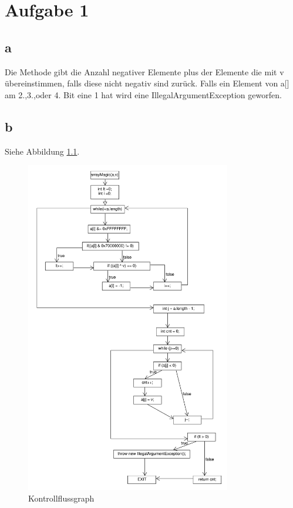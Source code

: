 \chapter{Aufgabe 1 }
\section*{a}
Die Methode gibt die Anzahl negativer Elemente plus der Elemente die mit v übereinstimmen, falls diese nicht negativ sind zurück. Falls ein Element von a[] am 2.,3.,oder 4. Bit eine 1 hat wird eine IllegalArgumentException geworfen.

\section*{b}
Siehe Abbildung \ref{fig:flowChart}.
\begin{figure}[h]
	\centering
	\includegraphics[width=0.8\textwidth, clip]{FlowChart.pdf}
	\caption{Kontrollflussgraph}
	\label{fig:flowChart}
\end{figure}
